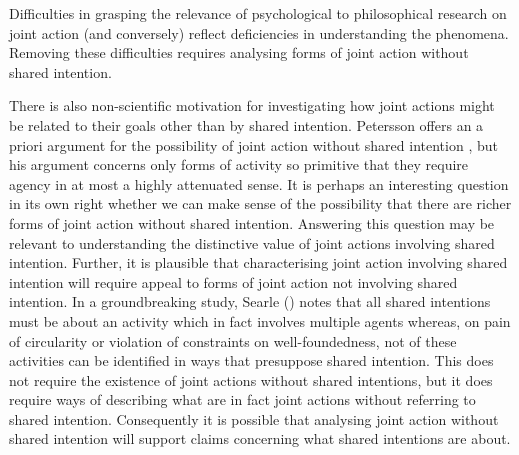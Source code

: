 \documentclass[12pt,a4paper]{extarticle}
\begin{document}
Difficulties in grasping the relevance of psychological to philosophical research on joint action (and conversely) reflect deficiencies in understanding the phenomena.
Removing these difficulties requires analysing forms of joint action without shared intention.

There is also non-scientific motivation for investigating how joint actions might be related to their goals other than by shared intention.  
Petersson offers an a priori argument for the possibility of joint action without shared intention \citep{petersson_collectivity_2007}, but his argument concerns only forms of activity so primitive that they require agency in at most a highly attenuated sense.
It is perhaps an interesting question in its own right whether we can make sense of the possibility that there are richer forms of joint action without shared intention.
Answering this question may be relevant to understanding the distinctive value of joint actions involving shared intention.
Further, it is plausible that characterising joint action involving shared intention will require appeal to forms of joint action not involving shared intention.
In a groundbreaking study, Searle (\citeyear{Searle:1990em}) notes that all shared intentions must be about an activity which in fact involves multiple agents whereas, on pain of circularity or violation of constraints on well-foundedness, not of these activities can be  identified in ways that presuppose shared intention.
This does not require the existence of joint actions without shared intentions, but it does require ways of describing what are in fact joint actions without referring to shared intention.
Consequently it is possible that analysing joint action without shared intention will support claims concerning what shared intentions are about.
\end{document}
